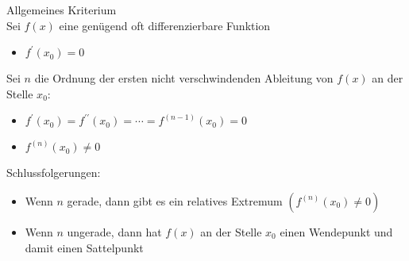 \begin{concept}{Allgemeines Kriterium}\\
    Sei $f(x)$ eine genügend oft differenzierbare Funktion

\begin{itemize}
  \item $f^{\prime}\left(x_{0}\right)=0$
\end{itemize}

Sei $n$ die Ordnung der ersten nicht verschwindenden Ableitung von $f(x)$ an der Stelle $x_{0}$:

\begin{itemize}
  \item $f^{\prime}\left(x_{0}\right)=f^{\prime \prime}\left(x_{0}\right)=\cdots=f^{(n-1)}\left(x_{0}\right)=0$
  \item $f^{(n)}\left(x_{0}\right) \neq 0$
\end{itemize}

Schlussfolgerungen:
\begin{itemize}
    \item Wenn $n$ gerade, dann gibt es ein relatives Extremum $\left(f^{(n)}\left(x_{0}\right) \neq 0\right)$
    \item Wenn $n$ ungerade, dann hat $f(x)$ an der Stelle $x_{0}$ einen Wendepunkt und damit einen Sattelpunkt
\end{itemize}
\end{concept}

